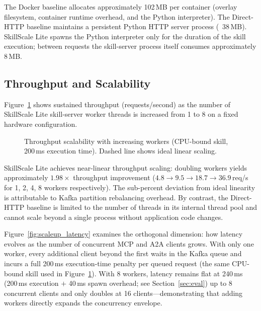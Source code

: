 \documentclass[sigconf,nonacm]{acmart}
\begin{document}
The Docker baseline allocates approximately 102\,MB per container (overlay filesystem, container runtime overhead, and the Python interpreter). The Direct-HTTP baseline maintains a persistent Python HTTP server process (~38\,MB). SkillScale Lite spawns the Python interpreter only for the duration of the skill execution; between requests the skill-server process itself consumes approximately 8\,MB.

\subsection{Throughput and Scalability}

Figure~\ref{fig:scaling} shows sustained throughput (requests/second) as the number of SkillScale Lite skill-server worker threads is increased from 1 to 8 on a fixed hardware configuration.

\begin{figure}[h]
\centering
{}
\caption{Throughput scalability with increasing workers (CPU-bound skill, 200\,ms execution time). Dashed line shows ideal linear scaling.}
\label{fig:scaling}
\end{figure}

SkillScale Lite achieves near-linear throughput scaling: doubling workers yields approximately $1.98\times$ throughput improvement ($4.8 \rightarrow 9.5 \rightarrow 18.7 \rightarrow 36.9$\,req/s for 1, 2, 4, 8 workers respectively). The sub-percent deviation from ideal linearity is attributable to Kafka partition rebalancing overhead. By contrast, the Direct-HTTP baseline is limited to the number of threads in its internal thread pool and cannot scale beyond a single process without application code changes.

Figure~\ref{fig:scaleup_latency} examines the orthogonal dimension: how latency evolves as the number of concurrent MCP and A2A clients grows. With only one worker, every additional client beyond the first waits in the Kafka queue and incurs a full 200\,ms execution-time penalty per queued request (the same CPU-bound skill used in Figure~\ref{fig:scaling}). With 8 workers, latency remains flat at 240\,ms (200\,ms execution $+$ 40\,ms spawn overhead; see Section~\ref{sec:eval}) up to 8 concurrent clients and only doubles at 16 clients---demonstrating that adding workers directly expands the concurrency envelope.
\end{document}

